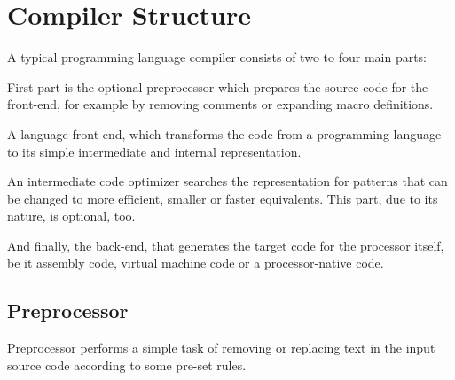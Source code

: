     \section{Compiler Structure}

    A typical programming language compiler consists of two to four main parts:

    First part is the optional preprocessor which prepares the source code for the front-end, for example by removing comments or expanding macro definitions.

    A language front-end, which transforms the code from a programming language to its simple intermediate and internal representation.

    An intermediate code optimizer searches the representation for patterns that can be changed to more efficient, smaller or faster equivalents. This part, due to its nature, is optional, too.

    And finally, the back-end, that generates the target code for the processor itself, be it assembly code, virtual machine code or a processor-native code.

    \begin{center}\end{center}

        \subsection{Preprocessor}

        Preprocessor performs a simple task of removing or replacing text in the input source code according to some pre-set rules.

